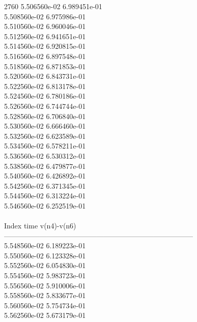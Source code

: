 2760	5.506560e-02	6.989451e-01	\\ 	5.508560e-02	6.975986e-01	\\ 	5.510560e-02	6.960046e-01	\\ 	5.512560e-02	6.941651e-01	\\ 	5.514560e-02	6.920815e-01	\\ 	5.516560e-02	6.897548e-01	\\ 	5.518560e-02	6.871853e-01	\\ 	5.520560e-02	6.843731e-01	\\ 	5.522560e-02	6.813178e-01	\\ 	5.524560e-02	6.780186e-01	\\ 	5.526560e-02	6.744744e-01	\\ 	5.528560e-02	6.706840e-01	\\ 	5.530560e-02	6.666460e-01	\\ 	5.532560e-02	6.623589e-01	\\ 	5.534560e-02	6.578211e-01	\\ 	5.536560e-02	6.530312e-01	\\ 	5.538560e-02	6.479877e-01	\\ 	5.540560e-02	6.426892e-01	\\ 	5.542560e-02	6.371345e-01	\\ 	5.544560e-02	6.313224e-01	\\ 	5.546560e-02	6.252519e-01	\\ \hline
\\ \hline
Index   time            v(n4)-v(n6)     \\ \hline
--------------------------------------------------------------------------------\\ 	5.548560e-02	6.189223e-01	\\ 	5.550560e-02	6.123328e-01	\\ 	5.552560e-02	6.054830e-01	\\ 	5.554560e-02	5.983723e-01	\\ 	5.556560e-02	5.910006e-01	\\ 	5.558560e-02	5.833677e-01	\\ 	5.560560e-02	5.754734e-01	\\ 	5.562560e-02	5.673179e-01	\\ \hline
